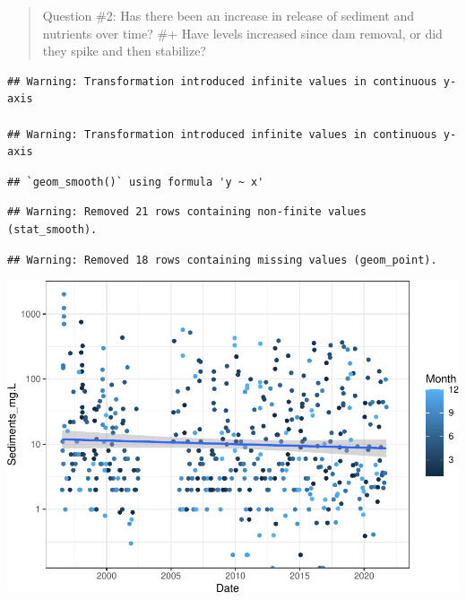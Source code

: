 \documentclass[
  12pt,
]{article}
\newenvironment{Shaded}{\begin{snugshade}}{\end{snugshade}}
\newcommand{\AttributeTok}[1]{\textcolor[rgb]{0.77,0.63,0.00}{#1}}
\newcommand{\CommentTok}[1]{\textcolor[rgb]{0.56,0.35,0.01}{\textit{#1}}}
\newcommand{\FunctionTok}[1]{\textcolor[rgb]{0.00,0.00,0.00}{#1}}
\newcommand{\NormalTok}[1]{#1}
\newcommand{\SpecialCharTok}[1]{\textcolor[rgb]{0.00,0.00,0.00}{#1}}
\newcommand{\StringTok}[1]{\textcolor[rgb]{0.31,0.60,0.02}{#1}}
\begin{document}
\newpage

\begin{quote}
Question \#2: Has there been an increase in release of sediment and
nutrients over time? \#+ Have levels increased since dam removal, or did
they spike and then stabilize?
\end{quote}

\begin{Shaded}
\end{Shaded}

\begin{verbatim}
## Warning: Transformation introduced infinite values in continuous y-axis

## Warning: Transformation introduced infinite values in continuous y-axis
\end{verbatim}

\begin{verbatim}
## `geom_smooth()` using formula 'y ~ x'
\end{verbatim}

\begin{verbatim}
## Warning: Removed 21 rows containing non-finite values (stat_smooth).
\end{verbatim}

\begin{verbatim}
## Warning: Removed 18 rows containing missing values (geom_point).
\end{verbatim}

\includegraphics{Project_Template_files/figure-latex/Sediment_Analysis-1.pdf}
\end{document}
